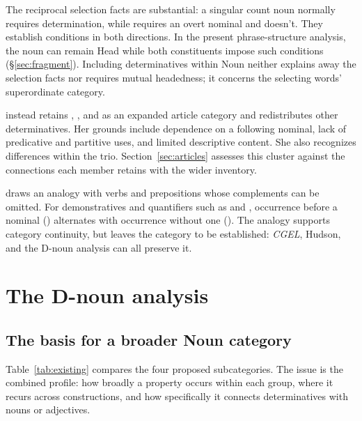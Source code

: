 \documentclass[12pt]{article}
\begin{document}
The reciprocal selection facts are substantial: a singular count noun normally requires determination, while  requires an overt nominal and  doesn't. They establish conditions in both directions. In the present phrase-structure analysis, the noun can remain Head while both constituents impose such conditions (§\ref{sec:fragment}). Including determinatives within Noun neither explains away the selection facts nor requires mutual headedness; it concerns the selecting words' superordinate category.

\textcite[153--158]{spinillo2004reconceptualising} instead retains , , and  as an expanded article category and redistributes other determinatives. Her grounds include dependence on a following nominal, lack of predicative and partitive uses, and limited descriptive content. She also recognizes differences within the trio. Section~\ref{sec:articles} assesses this cluster against the connections each member retains with the wider inventory.

\textcite[140--144]{spinillo2004reconceptualising} draws an analogy with verbs and prepositions whose complements can be omitted. For demonstratives and quantifiers such as  and , occurrence before a nominal () alternates with occurrence without one (). The analogy supports category continuity, but leaves the category to be established: \textit{CGEL}, Hudson, and the D-noun analysis can all preserve it.

\section{The D-noun analysis}\label{sec:proposal}

\subsection{The basis for a broader Noun category}\label{sec:membership}

Table~\ref{tab:existing} compares the four proposed subcategories. The issue is the combined profile: how broadly a property occurs within each group, where it recurs across constructions, and how specifically it connects determinatives with nouns or adjectives.
\end{document}

